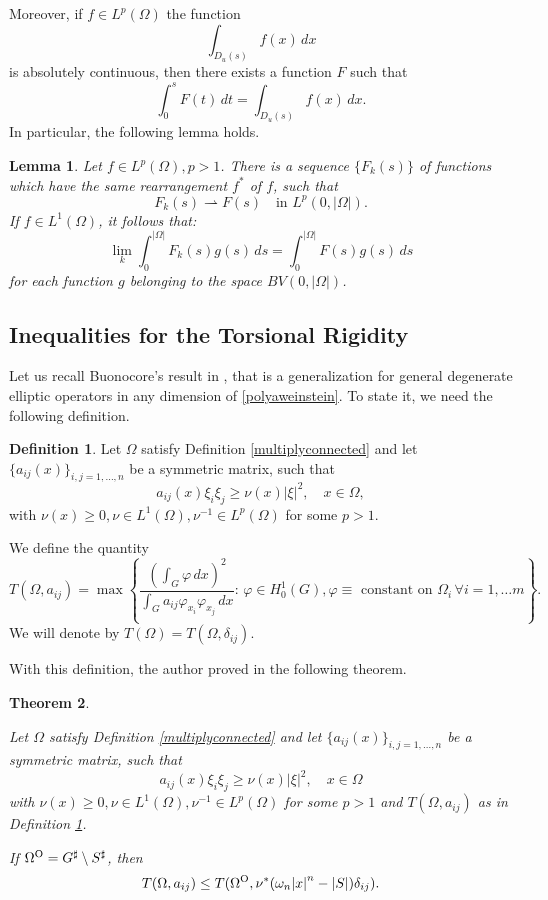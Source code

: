 \documentclass[oneside,a4paper,11pt,notitlepage]{article}
\newcommand{\abs}[1]{{\left|#1\right|}}
\theoremstyle{definition}
\newtheorem{definizione}{Definition}[section]
\theoremstyle{plain}
\newtheorem{theorem}{Theorem}[section]
\newtheorem{lemma}[theorem]{Lemma}
\theoremstyle{definition}
\newcommand{\OO}{\text{\normalfont  O}}
\begin{document}
Moreover, if $f\in L^p(\Omega)$ the function \[\int_{D_u(s)}f(x)\,dx\] is absolutely continuous, then there exists a function $F$ such that 
\begin{equation}\label{defpseudorear}
    \int_0^sF(t)\,dt=\int_{D_u(s)}f(x)\,dx.
\end{equation}
In particular, the following lemma \cite[Lemma 2.2]{AT} holds.
\begin{lemma}%
    Let $f\in L^p(\Omega),p>1$. There is a sequence $\{F_k(s)\}$ of functions which have the same rearrangement $f^*$ of $f$, such that \[F_k(s)\rightharpoonup F(s)\quad\text{in }L^p(0,|\Omega|).\]
    If $f\in L^1(\Omega)$, it follows that: \[\lim_k\int_0^{|\Omega|}F_k(s)g(s)\,ds=\int_0^{|\Omega|}F(s)g(s)\,ds\] for each function $g$ belonging to the space $BV(0,|\Omega|)$.
\end{lemma}
\subsection{Inequalities for the Torsional Rigidity}
Let  us recall Buonocore's result in \cite{B}, that is a generalization for general degenerate elliptic operators in any dimension of \eqref{polyaweinstein}. To state it, we need the following definition.
\begin{definizione}
\label{torsion-buonocore}
    Let $\Omega$ satisfy Definition \ref{multiplyconnected} and let $\{a_{ij}(x)\}_{i,j=1,\dots,n}$ be a symmetric matrix, such that \begin{equation*}
    a_{ij}(x)\xi_i\xi_j\geq\nu(x)\abs{\xi}^2,\quad x\in\Omega,
    \end{equation*}
    with $\nu(x)\geq0,\nu\in L^1(\Omega),\nu^{-1}\in L^p(\Omega)$ for some $p>1$.

We define the quantity
\begin{equation*}
    T(\Omega,a_{ij})= \max\left\{ \frac{\displaystyle \left(\int_G \varphi\, dx\right)^2}{\displaystyle \int_Ga_{ij} \varphi_{x_i}\varphi_{x_j} \,dx} : \, \varphi \in H^1_0(G), \varphi\equiv \text{ constant on }  \Omega_i \, \forall i=1, \dots m  \right\}.
\end{equation*}
We will denote by $T(\Omega)=T(\Omega,\delta_{ij})$.

With this definition, the author proved in \cite[Theorem 2.1]{B} the following theorem.

\end{definizione}
\begin{theorem}\label{buonocore}

Let $\Omega$ satisfy Definition \ref{multiplyconnected} and let $\{a_{ij}(x)\}_{i,j=1,\dots,n}$ be a symmetric matrix, such that \begin{equation*}
    a_{ij}(x)\xi_i\xi_j\geq\nu(x)\abs{\xi}^2,\quad x\in\Omega
    \end{equation*}
    with $\nu(x)\geq0,\nu\in L^1(\Omega),\nu^{-1}\in L^p(\Omega)$ for some $p>1$ and $T(\Omega,a_{ij})$ as in Definition \ref{torsion-buonocore}.
    
If $\Omega^\OO 
=G^\sharp \setminus S^\sharp $, then
$$T(\Omega,a_{ij})\leq T(\Omega^\OO,\nu^\ast(\omega_{n}\abs{x}^n- \abs{S})\delta_{ij}).$$
\end{theorem}
\end{document}
